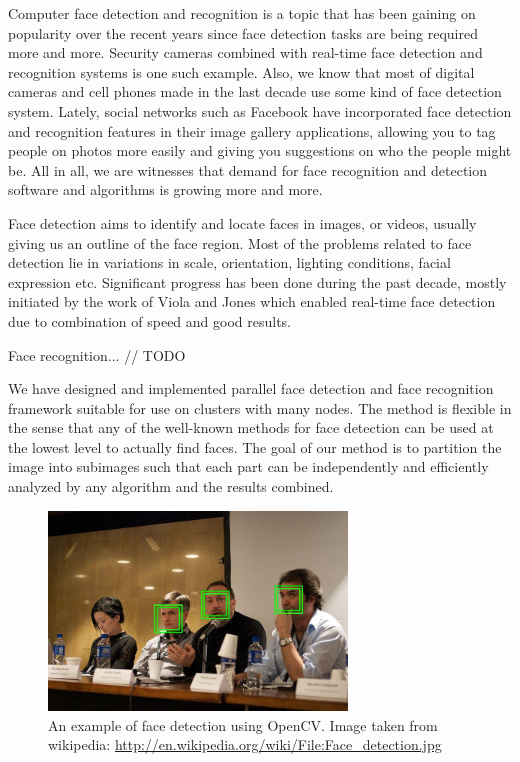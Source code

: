 \documentclass[11pt, draftclsnofoot, onecolumn]{IEEEtran}
\begin{document}
Computer face detection and recognition is a topic that has been gaining on popularity over the recent years since face detection tasks are being required more and more. Security cameras combined with real-time face detection and recognition systems is one such example. Also, we know that most of digital cameras and cell phones made in the last decade use some kind of face detection system. Lately, social networks such as Facebook have incorporated face detection and recognition features in their image gallery applications, allowing you to tag people on photos more easily and giving you suggestions on who the people might be. All in all, we are witnesses that demand for face recognition and detection software and algorithms is growing more and more.

Face detection aims to identify and locate faces in images, or videos, usually giving us an outline of the face region. Most of the problems related to face detection lie in variations in scale, orientation, lighting conditions, facial expression etc. Significant progress has been done during the past decade, mostly initiated by the work of Viola and Jones \cite{IWSCTV2001} which enabled real-time face detection due to combination of speed and good results.

Face recognition... // TODO

We have designed and implemented parallel face detection and face recognition framework suitable for use on clusters with many nodes. The method is flexible in the sense that any of the well-known methods for face detection can be used at the lowest level to actually find faces. The goal of our method is to partition the image into subimages such that each part can be independently and efficiently analyzed by any algorithm and the results combined.

\begin{figure}[t]
\centering
\includegraphics[width=300]{img2}
\caption{An example of face detection using OpenCV. Image taken from wikipedia: \url{http://en.wikipedia.org/wiki/File:Face_detection.jpg}}
\end{figure}
\end{document}

